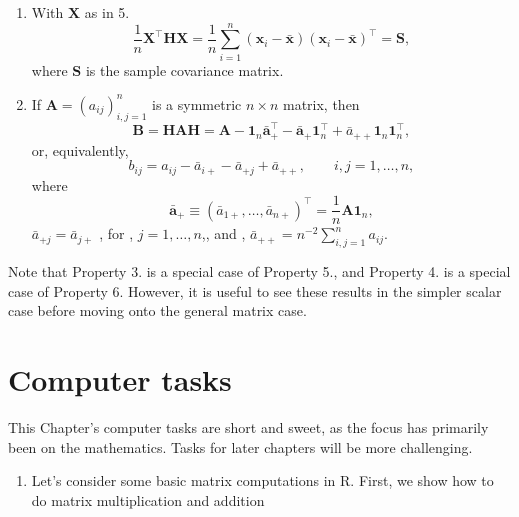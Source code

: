 \documentclass[]{book}
\providecommand{\tightlist}{%
  \setlength{\itemsep}{0pt}\setlength{\parskip}{0pt}}
\theoremstyle{definition}
\theoremstyle{definition}
\theoremstyle{definition}
\theoremstyle{remark}
\begin{document}
\begin{enumerate}
\[\begin{array}{ccc}
  -&(\boldsymbol x_2 -\bar{\boldsymbol x})^\top&-\\
  &\vdots&\\
  -&(\boldsymbol x_n - \bar{\boldsymbol x})^\top&-
  \end{array}\right ]= \left[ \boldsymbol x_1 -\bar{\boldsymbol x}, \ldots , \boldsymbol x_n-\bar{\boldsymbol x}\right]^\top
  \]
  where \[\bar{\boldsymbol x} = \frac{1}{n} \sum_{i=1}^n \boldsymbol x_i \in \mathbb{R}^p\]
  is the p-dimensional sample mean of \(\boldsymbol x_1, \ldots, \boldsymbol x_n\in \mathbb{R}^p\). In words, \(\boldsymbol H\) has subtracted the column mean from each column of \(\boldsymbol X\).
\item
  With \(\boldsymbol X\) as in 5.
  \[
  \frac{1}{n}\boldsymbol X^\top \boldsymbol H\boldsymbol X=\frac{1}{n} \sum_{i=1}^n (\boldsymbol x_i -\bar{\boldsymbol x})(\boldsymbol x_i -\bar{\boldsymbol x})^\top =\boldsymbol S,
  \]
  where \(\boldsymbol S\) is the sample covariance matrix.
\item
  If \(\boldsymbol A=(a_{ij})_{i,j=1}^n\) is a symmetric \(n \times n\) matrix, then
  \[
  \boldsymbol B=\boldsymbol H\boldsymbol A\boldsymbol H= \boldsymbol A- {\mathbf 1}_n \bar{\boldsymbol a}_+^\top -\bar{\boldsymbol a}_+{\mathbf 1}_n^\top +\bar{a}_{++}{\mathbf 1}_n {\mathbf 1}_n^\top,
  \]
  or, equivalently,
  \[
  b_{ij}=a_{ij}-\bar{a}_{i+}-\bar{a}_{+j}+\bar{a}_{++}, \qquad i,j=1, \ldots , n,
  \]
  where
  \[
  \bar{\boldsymbol a}_{+}\equiv (\bar{a}_{1+}, \ldots , \bar{a}_{n+})^\top=\frac{1}{n}\boldsymbol A{\mathbf 1}_n,
  \]
  \(\bar{a}_{+j}=\bar{a}_{j+}\) , for , \(j=1, \ldots , n\),, and , \(\bar{a}_{++}=n^{-2}\sum_{i,j=1}^n a_{ij}\).
\end{enumerate}

Note that Property 3. is a special case of Property 5., and Property 4. is a special case of Property 6.
However, it is useful to see these results in the simpler scalar case before moving onto the general matrix case.

\hypertarget{tasks-ch2}{%
\section{Computer tasks}\label{tasks-ch2}}

This Chapter's computer tasks are short and sweet, as the focus has primarily been on the mathematics. Tasks for later chapters will be more challenging.

\begin{enumerate}
\def\labelenumi{\arabic{enumi}.}
\setcounter{enumi}{-1}
\tightlist
\item
  Let's consider some basic matrix computations in R. First, we show how to do matrix multiplication and addition
\end{enumerate}
\end{document}
